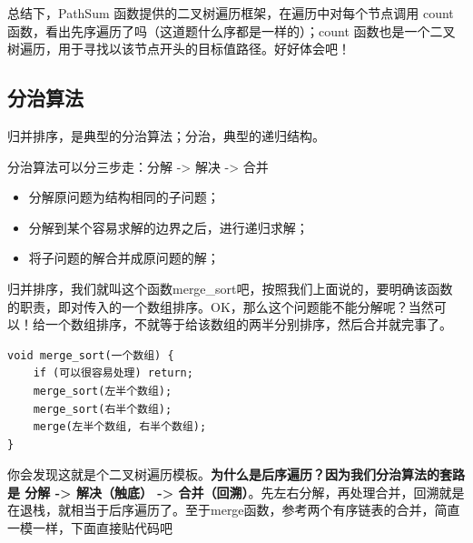 \documentclass[12pt]{article}
\begin{document}
总结下，PathSum 函数提供的二叉树遍历框架，在遍历中对每个节点调用 count 函数，看出先序遍历了吗（这道题什么序都是一样的）；count 函数也是一个二叉树遍历，用于寻找以该节点开头的目标值路径。好好体会吧！

\subsection{分治算法}
归并排序，是典型的分治算法；分治，典型的递归结构。

分治算法可以分三步走：分解 -> 解决 -> 合并
\begin{itemize}
\setlength{\itemsep}{0pt}
\setlength{\parsep}{0pt}
\setlength{\parskip}{0pt}
    \item 分解原问题为结构相同的子问题；
    \item 分解到某个容易求解的边界之后，进行递归求解；
    \item 将子问题的解合并成原问题的解；
\end{itemize}

归并排序，我们就叫这个函数merge\_sort吧，按照我们上面说的，要明确该函数的职责，即对传入的一个数组排序。OK，那么这个问题能不能分解呢？当然可以！给一个数组排序，不就等于给该数组的两半分别排序，然后合并就完事了。
\begin{lstlisting}
void merge_sort(一个数组) {
    if (可以很容易处理) return;
    merge_sort(左半个数组);
    merge_sort(右半个数组);
    merge(左半个数组, 右半个数组);
}
\end{lstlisting}

你会发现这就是个二叉树遍历模板。\textbf{为什么是后序遍历？因为我们分治算法的套路是 分解 -> 解决（触底） -> 合并（回溯）}。先左右分解，再处理合并，回溯就是在退栈，就相当于后序遍历了。至于merge函数，参考两个有序链表的合并，简直一模一样，下面直接贴代码吧
\end{document}
